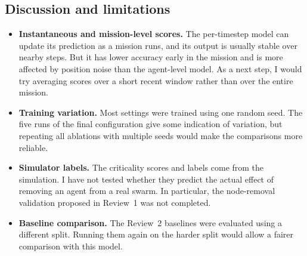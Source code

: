 \documentclass[11pt,a4paper]{article}
\begin{document}
\subsection{Discussion and limitations}
\begin{itemize}
\item \textbf{Instantaneous and mission-level scores.} The per-timestep model can update its prediction as
a mission runs, and its output is usually stable over nearby steps. But it has lower accuracy early in the
mission and is more affected by position noise than the agent-level model. As a next step, I would try
averaging scores over a short recent window rather than over the entire mission.
\item \textbf{Training variation.} Most settings were trained using one random seed. The five runs of the
final configuration give some indication of variation, but repeating all ablations with multiple seeds
would make the comparisons more reliable.
\item \textbf{Simulator labels.} The criticality scores and labels come from the simulation. I have not
tested whether they predict the actual effect of removing an agent from a real swarm. In particular, the
node-removal validation proposed in Review~1 was not completed.
\item \textbf{Baseline comparison.} The Review~2 baselines were evaluated using a different split. Running
them again on the harder split would allow a fairer comparison with this model.

\end{itemize}
\end{document}
